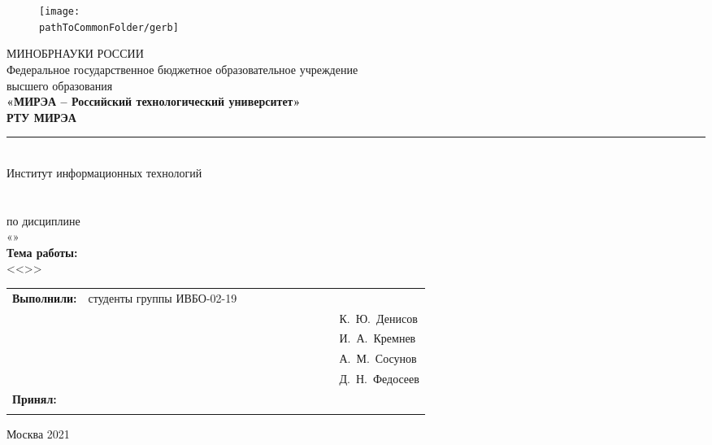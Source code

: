

\renewcommand{\studentfio}{К.~Ю.~Денисов\\
				& & \hfill И.~А.~Кремнев \\
				& & \hfill А.~М.~Сосунов\\
				& & \hfill Д.~Н.~Федосеев}

\begin{center}
	\begin{figure}[h!]
		\begin{center}
			\texttt{[image: \\pathToCommonFolder/gerb]}
		\end{center}	
	\end{figure}
	\small	МИНОБРНАУКИ РОССИИ \\
	Федеральное государственное бюджетное образовательное учреждение\\
	высшего образования\\
	\normalsize					
	\textbf{«МИРЭА – Российский технологический университет»\\
		РТУ МИРЭА}\\
	\noindent\rule{1\linewidth}{1pt}\\
	Институт информационных технологий\\ %
	\kafedra\\
	\vspace{3ex}
	\large \textbf{\workname}  \\
	по дисциплине\\ «\discipline» \\
	\vspace{3ex}
	\if \withouttheme
	\textbf{Тема работы:}\\ <<\theme>>
	\fi
	\vspace{6ex}
	\small
	\begin{table}[h!]
		\begin{tabular}{lp{0.6\linewidth}l}
			\textbf{Выполнили:} & студенты группы ИВБО-02-19 & \\ 
			& & \hfill \studentfio \\%
			\textbf{Принял:} & \rang & \\
			& & \hfill \teacherfio\\
		\end{tabular}
	\end{table}

	\normalsize
	
	\vfill
	Москва 2021
	
\end{center}